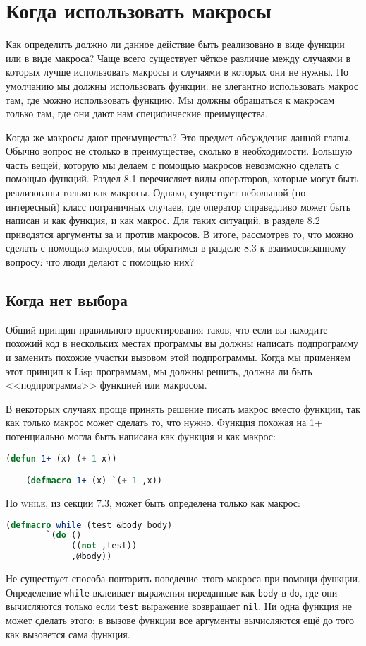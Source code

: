 \documentclass[12pt, a4paper]{article} %
\begin{document}
\section{Когда использовать макросы}

Как определить должно ли данное действие быть реализовано в виде функции или в виде макроса? Чаще всего существует чёткое различие между случаями в которых лучше использовать макросы и случаями в которых они не нужны. По умолчанию мы должны использовать функции: не элегантно использовать макрос там, где можно использовать функцию. Мы должны обращаться к макросам только там, где они дают нам специфические преимущества. 

Когда же макросы дают преимущества? Это предмет обсуждения данной главы. Обычно вопрос не столько в преимуществе, сколько в необходимости. Большую часть вещей, которую мы делаем с помощью макросов невозможно сделать с помощью функций. Раздел 8.1 перечисляет виды операторов, которые могут быть реализованы только как макросы. Однако, существует небольшой (но интересный) класс пограничных случаев, где оператор справедливо может быть написан и как функция, и как макрос. Для таких ситуаций, в разделе 8.2 приводятся аргументы за и против макросов. В итоге, рассмотрев то, что можно сделать с помощью макросов, мы обратимся в разделе 8.3 к взаимосвязанному вопросу: что люди делают с помощью них?

\subsection{Когда нет выбора}

Общий принцип правильного проектирования таков, что если вы находите похожий код в нескольких местах программы вы должны написать подпрограмму и заменить похожие участки вызовом этой подпрограммы. Когда мы применяем этот принцип к Lisp программам, мы должны решить, должна ли быть <<подпрограмма>> функцией или макросом.

В некоторых случаях проще принять решение писать макрос вместо функции, так как только макрос может сделать то, что нужно. Функция похожая на \textsc{1+} потенциально могла быть написана как функция и как макрос:
\begin{lstlisting}[language=Lisp]
    (defun 1+ (x) (+ 1 x))

    (defmacro 1+ (x) `(+ 1 ,x))
\end{lstlisting}
Но \textsc{while}, из секции 7.3, может быть определена только как макрос:
\begin{lstlisting}[language=Lisp]
    (defmacro while (test &body body)
        `(do ()
             ((not ,test))
             ,@body))
\end{lstlisting}
Не существует способа повторить поведение этого макроса при помощи функции. Определение \texttt{while} вклеивает выражения переданные как \texttt{body} в \texttt{do}, где они вычисляются только если \texttt{test} выражение возвращает \texttt{nil}. Ни одна функция не может сделать этого; в вызове функции все аргументы вычисляются ещё до того как вызовется сама функция.
\end{document}
